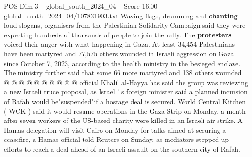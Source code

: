 \begin{textsample}{POS Dim 3 – global\_south\_2024\_04 – Score 16.00 – global\_south\_2024\_04/107831903.txt}
Waving flags, drumming and \textbf{chanting} loud slogans, organisers from the Palestinian Solidarity Campaign said they were expecting hundreds of thousands of people to join the rally.
The \textbf{protesters} voiced their anger with what happening in Gaza.
At least 34,454 Palestinians have been martyred and 77,575 others wounded in Israeli aggression on Gaza since October 7, 2023, according to the health ministry in the besieged enclave.
The ministry further said that some 66 more martyred and 138 others wounded @ @ @ @ @ @ @ @ @ @ official Khalil al-Hayya has said the group was reviewing a new Israeli truce proposal, as Israel ' s foreign minister said a planned incursion of Rafah would be"suspended"if a hostage deal is secured.
World Central Kitchen ( WCK ) said it would resume operations in the Gaza Strip on Monday, a month after seven workers of the US-based charity were killed in an Israeli air strike.
A Hamas delegation will visit Cairo on Monday for talks aimed at securing a ceasefire, a Hamas official told Reuters on Sunday, as mediators stepped up efforts to reach a deal ahead of an Israeli assault on the southern city of Rafah.

\end{textsample}
